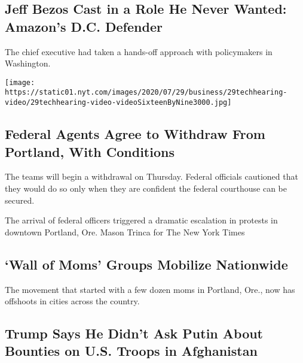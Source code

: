 \hypertarget{jeff-bezos-cast-in-a-role-he-never-wanted-amazons-dc-defender}{%
\subsection{Jeff Bezos Cast in a Role He Never Wanted: Amazon's D.C.
Defender}\label{jeff-bezos-cast-in-a-role-he-never-wanted-amazons-dc-defender}}

The chief executive had taken a hands-off approach with policymakers in
Washington.

\texttt{[image: https://static01.nyt.com/images/2020/07/29/business/29techhearing-video/29techhearing-video-videoSixteenByNine3000.jpg]}

\href{/2020/07/29/us/protests-portland-federal-withdrawal.html}{}

\hypertarget{federal-agents-agree-to-withdraw-from-portland-with-conditions}{%
\subsection{Federal Agents Agree to Withdraw From Portland, With
Conditions}\label{federal-agents-agree-to-withdraw-from-portland-with-conditions}}

The teams will begin a withdrawal on Thursday. Federal officials
cautioned that they would do so only when they are confident the federal
courthouse can be secured.

\href{/2020/07/29/us/protests-portland-federal-withdrawal.html}{}

The arrival of federal officers triggered a dramatic escalation in
protests in downtown Portland, Ore. Mason Trinca for The New York Times

\href{/2020/07/27/parenting/wall-of-moms-protests.html}{}

\hypertarget{wall-of-moms-groups-mobilize-nationwide}{%
\subsection{`Wall of Moms' Groups Mobilize
Nationwide}\label{wall-of-moms-groups-mobilize-nationwide}}

The movement that started with a few dozen moms in Portland, Ore., now
has offshoots in cities across the country.

\href{/2020/07/29/us/politics/trump-putin-bounties.html}{}

\hypertarget{trump-says-he-didnt-ask-putin-about-bounties-on-us-troops-in-afghanistan}{%
\subsection{Trump Says He Didn't Ask Putin About Bounties on U.S. Troops
in
Afghanistan}\label{trump-says-he-didnt-ask-putin-about-bounties-on-us-troops-in-afghanistan}}

